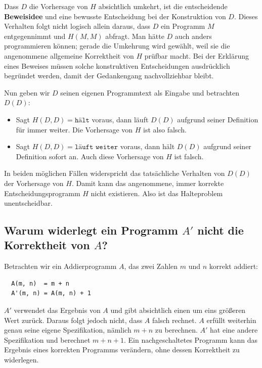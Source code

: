 \documentclass{article}
\begin{document}
\begin{merksatz}
Dass $D$ die Vorhersage von $H$ absichtlich umkehrt, ist die entscheidende \textbf{Beweisidee} und eine bewusste Entscheidung bei der Konstruktion von $D$. Dieses Verhalten folgt nicht logisch allein daraus, dass $D$ ein Programm $M$ entgegennimmt und $H(M,M)$ abfragt. Man hätte $D$ auch anders programmieren können; gerade die Umkehrung wird gewählt, weil sie die angenommene allgemeine Korrektheit von $H$ prüfbar macht. Bei der Erklärung eines Beweises müssen solche konstruktiven Entscheidungen ausdrücklich begründet werden, damit der Gedankengang nachvollziehbar bleibt.
\end{merksatz}

Nun geben wir $D$ seinen eigenen Programmtext als Eingabe und betrachten $D(D)$:

\begin{itemize}
  \item Sagt $H(D,D)=\texttt{hält}$ voraus, dann läuft $D(D)$ aufgrund seiner Definition für immer weiter. Die Vorhersage von $H$ ist also falsch.
  \item Sagt $H(D,D)=\texttt{läuft weiter}$ voraus, dann hält $D(D)$ aufgrund seiner Definition sofort an. Auch diese Vorhersage von $H$ ist falsch.
\end{itemize}

In beiden möglichen Fällen widerspricht das tatsächliche Verhalten von $D(D)$ der Vorhersage von $H$. Damit kann das angenommene, immer korrekte Entscheidungsprogramm $H$ nicht existieren. Also ist das Halteproblem unentscheidbar.

\subsection{Warum widerlegt ein Programm $A'$ nicht die Korrektheit von $A$?}

Betrachten wir ein Addierprogramm $A$, das zwei Zahlen $m$ und $n$ korrekt addiert:

\begin{verbatim}
  A(m, n)  = m + n
  A'(m, n) = A(m, n) + 1
\end{verbatim}

$A'$ verwendet das Ergebnis von $A$ und gibt absichtlich einen um eins größeren Wert zurück. Daraus folgt jedoch nicht, dass $A$ falsch rechnet. $A$ erfüllt weiterhin genau seine eigene Spezifikation, nämlich $m+n$ zu berechnen. $A'$ hat eine andere Spezifikation und berechnet $m+n+1$. Ein nachgeschaltetes Programm kann das Ergebnis eines korrekten Programms verändern, ohne dessen Korrektheit zu widerlegen.
\end{document}
